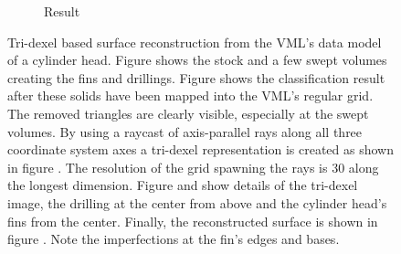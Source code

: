 \begin{figure}
\begin{subfigure}[t]{0.3\textwidth}
		\caption{Result}
		\label{fig:cylinder_head_reconstructed}
	\end{subfigure}
	\caption{
		Tri-dexel based surface reconstruction from the VML's data model of a cylinder head.
		Figure  shows the stock and a few swept volumes creating the fins and drillings.
		Figure  shows the classification result after these solids have been mapped into the VML's regular grid.
		The removed triangles are clearly visible, especially at the swept volumes.
		By using a raycast of axis-parallel rays along all three coordinate system axes a tri-dexel representation is created as shown in figure .
		The resolution of the grid spawning the rays is 30 along the longest dimension.
		Figure  and  show details of the tri-dexel image, the drilling at the center from above and the cylinder head's fins from the center.
		Finally, the reconstructed surface is shown in figure .
		Note the imperfections at the fin's edges and bases.
	}
	\label{fig:cylinder_head_dexel}
\end{figure}

